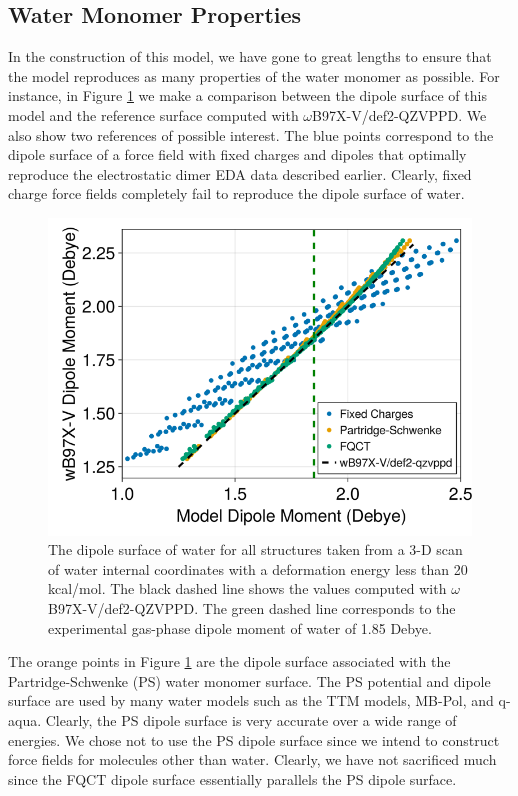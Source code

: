 \documentclass[journal=jacsat,manuscript=article]{achemso}
\begin{document}
\subsection*{Water Monomer Properties}

In the construction of this model, we have gone to great lengths to ensure that the model
reproduces as many properties of the water monomer as possible. For instance,
in Figure \ref{fig:dipole_surface} we make a comparison between the dipole
surface of this model and the reference surface computed with $\omega$B97X-V/def2-QZVPPD.
We also show two references of possible interest. The blue points correspond to the
dipole surface of a force field with fixed charges and dipoles that optimally
reproduce the electrostatic dimer EDA data described earlier. Clearly, fixed charge
force fields completely fail to reproduce the dipole surface of water.

\begin{figure}[H]
  \includegraphics*[width=\textwidth]{figures/dipole_surface.png}
  \caption{The dipole surface of water for all structures taken from a
  3-D scan of water internal coordinates with a deformation energy less than
  20 kcal/mol. The black dashed line shows the values computed with $\omega$B97X-V/def2-QZVPPD.
  The green dashed line corresponds to the experimental gas-phase dipole moment
  of water of 1.85 Debye.
}
  \label{fig:dipole_surface}
\end{figure}

The orange points in Figure \ref{fig:dipole_surface} are the dipole surface associated with
the Partridge-Schwenke (PS) water monomer surface.\cite{partridge1997determination}
The PS potential and dipole surface are used by many water models such as the TTM models,\cite{burnham1999parametrization,fanourgakis2006flexible}
MB-Pol\cite{babin2013development,babin2014development}, and q-aqua\cite{yu2022q}.
Clearly, the PS dipole surface is very accurate over a wide range of energies. We chose
not to use the PS dipole surface since we intend to construct
force fields for molecules other than water. Clearly, we have not sacrificed much
since the FQCT dipole surface essentially parallels the PS dipole surface.
\end{document}
